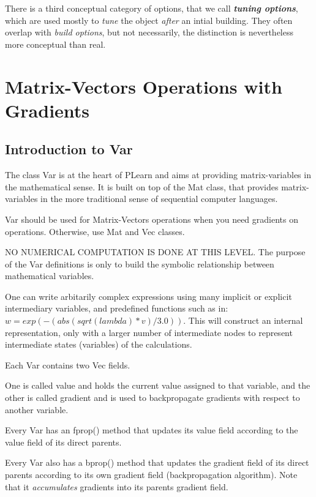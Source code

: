 \documentclass[11pt]{book}
\begin{document}
There is a third conceptual category of options, that we call {\em \bf
tuning options}, which are used mostly to {\em tune} the object {\em
after} an intial building. They often overlap with {\em build options},
but not necessarily, the distinction is nevertheless more conceptual
than real.





\section{Matrix-Vectors Operations with Gradients}
\label{Var}

\subsection{Introduction to Var}

The class Var is at the heart of PLearn and aims at providing
matrix-variables in the mathematical sense. It is built on top of the
Mat class, that provides matrix-variables in the more traditional sense
of sequential computer languages.

Var should be used for Matrix-Vectors operations when you need gradients
on operations. Otherwise, use Mat and Vec classes.

NO NUMERICAL COMPUTATION IS DONE AT THIS LEVEL. The purpose of the
Var definitions is only to build the symbolic relationship between
mathematical variables.

 One can write arbitarily complex expressions using many implicit or
explicit intermediary variables, and predefined functions such as
in: $w=exp(-(abs(sqrt(lambda)*v)/3.0))$.  This will construct an
internal representation, only with a larger number of intermediate
nodes to represent intermediate states (variables) of the calculations.

 Each Var contains two Vec fields.

One is called value and holds the current value assigned to that
variable, and the other is called gradient and is used to backpropagate
gradients with respect to another variable.

Every Var has an fprop() method that updates its value field according
to the value field of its direct parents.

Every Var also has a bprop() method that updates the gradient field of
its direct parents according to its own gradient field (backpropagation
algorithm). Note that it \emph{accumulates} gradients into its parents
gradient field.
\end{document}
